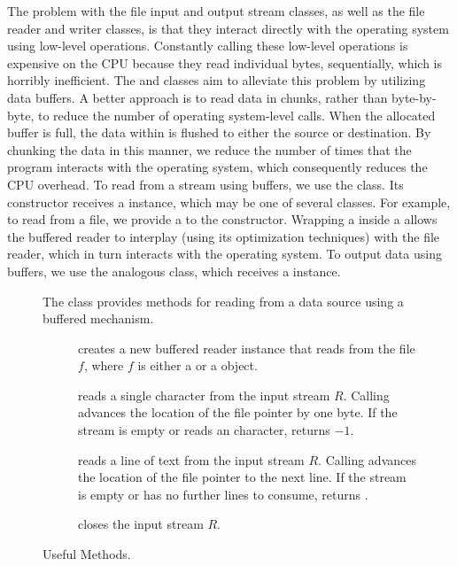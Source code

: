 The problem with the file input and output stream classes, as well as the file reader and writer classes, is that they interact directly with the operating system using low-level operations. 
Constantly calling these low-level operations is expensive on the CPU because they read individual bytes, sequentially, which is horribly inefficient. 
The  and  classes aim to alleviate this problem by utilizing data buffers. 
A better approach is to read data in chunks, rather than byte-by-byte, to reduce the number of operating system-level calls.
When the allocated buffer is full, the data within is flushed to either the source or destination. 
By chunking the data in this manner, we reduce the number of times that the program interacts with the operating system, which consequently reduces the CPU overhead.
To read from a stream using buffers, we use the  class. Its constructor receives a  instance, which may be one of several classes. 
For example, to read from a file, we provide a  to the  constructor. Wrapping a  inside a  allows the buffered reader to interplay (using its optimization techniques) with the file reader, which in turn interacts with the operating system. To output data using buffers, we use the analogous  class, which receives a  instance. 

\begin{figure}[tp]
  \small
  \begin{tcolorbox}[title=BufferedReader Methods]
    The  class provides methods for reading from a data source using a buffered mechanism.
    \vspace{2ex}
  \begin{description}
    \item [] creates a new buffered reader instance that reads from the file $f$, where $f$ is either a  or a  object.
    \item [] reads a single character from the input stream $R$. Calling  advances the location of the file pointer by one byte. If the stream is empty or reads an  character, returns $-1$.
    \item [] reads a line of text from the input stream $R$. Calling  advances the location of the file pointer to the next line. If the stream is empty or has no further lines to consume, returns .
    \item [] closes the input stream $R$.
  \end{description}
\end{tcolorbox}
  \caption{Useful  Methods.}
  \label{fig:br}
\end{figure}

